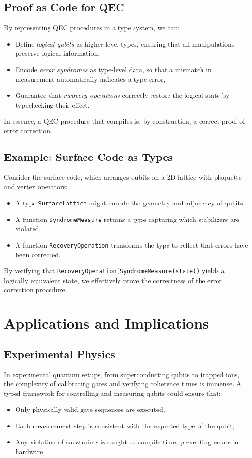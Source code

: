 \documentclass[12pt]{article}
\begin{document}
\subsection{Proof as Code for QEC}
By representing QEC procedures in a type system, we can:
\begin{itemize}[label=$\bullet$]
    \item Define \emph{logical qubits} as higher-level types, ensuring that all manipulations preserve logical information,
    \item Encode \emph{error syndromes} as type-level data, so that a mismatch in measurement automatically indicates a type error,
    \item Guarantee that \emph{recovery operations} correctly restore the logical state by typechecking their effect.
\end{itemize}
In essence, a QEC procedure that compiles is, by construction, a correct proof of error correction.

\subsection{Example: Surface Code as Types}
Consider the surface code, which arranges qubits on a 2D lattice with plaquette and vertex operators:
\begin{itemize}[label=$\bullet$]
    \item A type \texttt{SurfaceLattice} might encode the geometry and adjacency of qubits.
    \item A function \texttt{SyndromeMeasure} returns a type capturing which stabilizers are violated.
    \item A function \texttt{RecoveryOperation} transforms the type to reflect that errors have been corrected.
\end{itemize}
By verifying that \texttt{RecoveryOperation(SyndromeMeasure(state))} yields a logically equivalent state, we effectively prove the correctness of the error correction procedure.

\section{Applications and Implications}
\label{sec:applications}

\subsection{Experimental Physics}
In experimental quantum setups, from superconducting qubits to trapped ions, the complexity of calibrating gates and verifying coherence times is immense. A typed framework for controlling and measuring qubits could ensure that:
\begin{itemize}[label=$\bullet$]
    \item Only physically valid gate sequences are executed,
    \item Each measurement step is consistent with the expected type of the qubit,
    \item Any violation of constraints is caught at compile time, preventing errors in hardware.
\end{itemize}
\end{document}
